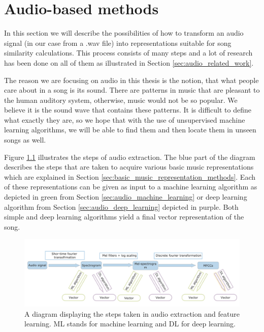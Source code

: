 \chapter{Audio-based methods}\label{chap:audio_methods}
In this section we will describe the possibilities of how to transform an audio signal (in our case from a .wav file) into representations suitable for song similarity calculations. This process consists of many steps and a lot of research has been done on all of them as illustrated in Section \ref{sec:audio_related_work}. 

The reason we are focusing on audio in this thesis is the notion, that what people care about in a song is its sound. There are patterns in music that are pleasant to the human auditory system, otherwise, music would not be so popular. We believe it is the sound wave that contains these patterns. It is difficult to define what exactly they are, so we hope that with the use of unsupervised machine learning algorithms, we will be able to find them and then locate them in unseen songs as well. 

Figure \ref{fig:audio_extraction} illustrates the steps of audio extraction. The blue part of the diagram describes the steps that are taken to acquire various basic music representations which are explained in Section \ref{sec:basic_music_representation_methods}. Each of these representations can be given as input to a machine learning algorithm as depicted in green from Section \ref{sec:audio_machine_learning} or deep learning algorithm from Section \ref{sec:audio_deep_learning} depicted in purple. Both simple and deep learning algorithms yield a final vector representation of the song. 

\begin{figure}[h!]
    \centering
	\includegraphics[width=140mm]{./img/audio_feature_extraction_steps.png}
	\caption{A diagram displaying the steps taken in audio extraction and feature learning. ML stands for machine learning and DL for deep learning.}
	\label{fig:audio_extraction}
\end{figure}

